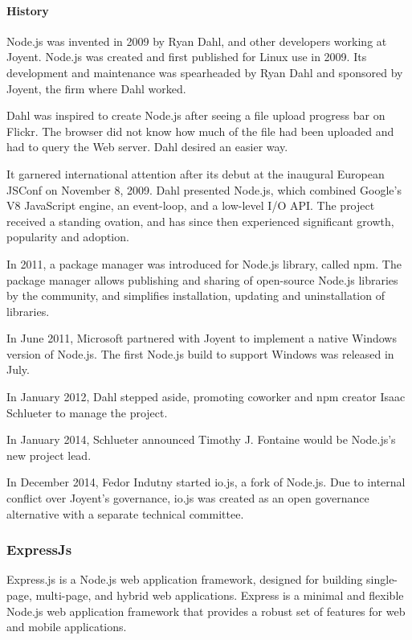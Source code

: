 \paragraph*{History}
\hfill \break
Node.js was invented in 2009 by Ryan Dahl, and other developers working at Joyent. Node.js was created and first published for Linux use in 2009. Its development and maintenance was spearheaded by Ryan Dahl and sponsored by Joyent, the firm where Dahl worked.

Dahl was inspired to create Node.js after seeing a file upload progress bar on Flickr. The browser did not know how much of the file had been uploaded and had to query the Web server. Dahl desired an easier way.

It garnered international attention after its debut at the inaugural European JSConf on November 8, 2009. Dahl presented Node.js, which combined Google's V8 JavaScript engine, an event-loop, and a low-level I/O API. The project received a standing ovation, and has since then experienced significant growth, popularity and adoption.

In 2011, a package manager was introduced for Node.js library, called npm. The package manager allows publishing and sharing of open-source Node.js libraries by the community, and simplifies installation, updating and uninstallation of libraries.

In June 2011, Microsoft partnered with Joyent to implement a native Windows version of Node.js. The first Node.js build to support Windows was released in July.

In January 2012, Dahl stepped aside, promoting coworker and npm creator Isaac Schlueter to manage the project.

In January 2014, Schlueter announced Timothy J. Fontaine would be Node.js's new project lead.

In December 2014, Fedor Indutny started io.js, a fork of Node.js. Due to internal conflict over Joyent's governance, io.js was created as an open governance alternative with a separate technical committee.

\subsubsection{ExpressJs}
Express.js is a Node.js web application framework, designed for building single-page, multi-page, and hybrid web applications.
Express is a minimal and flexible Node.js web application framework that provides a robust set of features for web and mobile applications.
